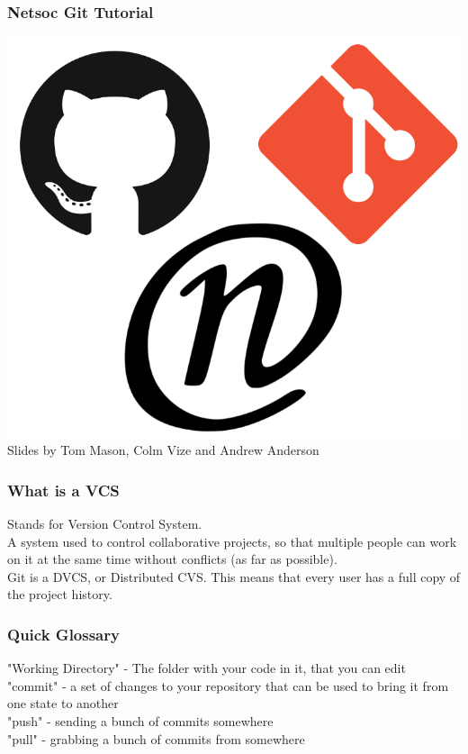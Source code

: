 \documentclass[xcolor=dvipsnames]{beamer}
\begin{document}
\begin{frame}
    \frametitle{Netsoc Git Tutorial}

    \begin{center}
        \includegraphics[scale=0.3]{nat.png}\\
        Slides by Tom Mason, Colm Vize and Andrew Anderson
    \end{center}
\end{frame}

\begin{frame}
    \frametitle{What is a VCS}
    
    Stands for Version Control System.\\
    A system used to control collaborative projects, so that multiple people can work on it at the same
    time without conflicts (as far as possible).\\
    Git is a DVCS, or Distributed CVS. This means that every user has a full copy of the project history.\\
\end{frame}

\begin{frame}
    \frametitle{Quick Glossary}
    "Working Directory" - The folder with your code in it, that you can edit\\
    "commit" - a set of changes to your repository that can be used to bring it from one state to another\\
    "push" - sending a bunch of commits somewhere\\
    "pull" - grabbing a bunch of commits from somewhere
\end{frame}
\end{document}

